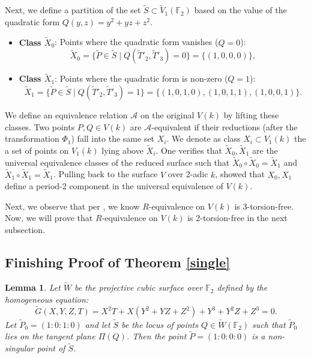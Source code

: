 \documentclass[11pt]{article}
\newtheorem{lemma}[theorem]{Lemma}
\theoremstyle{definition}
\newcommand{\tX}{\tilde{X}}
\begin{document}
\label{adm}
Next, we define a partition of the set $\tilde{S} \subset \tilde{V}_1(\mathbb{F}_2)$ based on the value of the quadratic form $Q(y,z) = y^2+yz+z^2$.
\begin{itemize}
    \item \textbf{Class $\tilde X_0$}: Points where the quadratic form vanishes ($Q=0$):
    \begin{equation}
        \tilde X_0 = \{ \tilde{P} \in \tilde{S} \mid Q(\tilde T'_2, \tilde T'_3) = 0 \} = \{ (1,0,0,0) \},
    \end{equation}
    \item \textbf{Class $\tilde X_1$}: Points where the quadratic form is non-zero ($Q=1$):
    \begin{equation}
        \tilde X_1 = \{ \tilde{P} \in \tilde{S} \mid Q(\tilde T'_2, \tilde T'_3) = 1 \} = \{ (1,0,1,0), (1,0,1,1), (1,0,0,1) \}.
    \end{equation}
\end{itemize}
We define an equivalence relation $\mathcal{A}$ on the original $V(k)$ by lifting these classes.
Two points $P, Q \in V(k)$ are $\mathcal{A}$-equivalent if their reductions (after the transformation $\Phi_1$) fall into the same set $X_i$.
We denote as class $X_i \subset V_1(k)$ the a set of points on $V_1(k)$ lying above $\tilde X_i$.
One verifies that $\tX_0, \tX_1$ are the universal equivalence classes of the reduced surface such that $\tX_0 \circ \tX_0 = \tX_1$ and $\tX_1 \circ \tX_1 = \tX_1$.
Pulling back to the surface $V$ over 2-adic $k$, \cite{dimitrikanevsky} showed that $X_0, X_1$ define a period-2 component in the universal equivalence of $V(k)$.

Next, we  observe that per , we know $R$-equivalence on $V(k)$ is 3-torsion-free.
Now, we will prove that $R$-equivalence on $V(k)$ is 2-torsion-free in the next subsection.

\subsection{Finishing Proof of Theorem \ref{single}}
\begin{lemma}
\label{thm:locus}
    Let $\tilde W$ be the projective cubic surface over $\mathbb{F}_2$ defined by the homogeneous equation:
    \begin{equation}
    \label{tildeG}
        \tilde G(X, Y, Z, T) = X^2T + X(Y^2 + YZ + Z^2) + Y^3 + Y^2Z + Z^3 = 0.
    \end{equation}
    Let $\tilde{P}_0 = (1:0:1:0)$ and let $\tilde{S}$ be the locus of points $Q \in \tilde W(\mathbb{F}_2)$ such that $\tilde{P}_0$ lies on the tangent plane $\Pi(Q)$. Then the point $\tilde{P} = (1:0:0:0)$ is a non-singular point of $\tilde{S}$.
\end{lemma}
\end{document}
